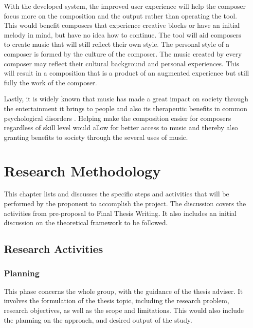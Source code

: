With the developed system, the improved user experience will help the composer focus more on the composition and the output rather than operating the tool. This would benefit composers that experience creative blocks or have an initial melody in mind, but have no idea how to continue. The tool will aid composers to create music that will still reflect their own style. The personal style of a composer is formed by the culture of the composer. The music created by every composer may reflect their cultural background and personal experiences. This will result in a composition that is a product of an augmented experience but still fully the work of the composer.

Lastly, it is widely known that music has made a great impact on society through the entertainment it brings to people \citep{hawkins2013pac, donnelly2005spectre} and also its therapeutic benefits in common psychological disorders \citep{kemper2005music}. Helping make the composition easier for composers regardless of skill level would allow for better access to music and thereby also granting benefits to society through the several uses of music.


\section{Research Methodology}
This chapter lists and discusses the specific steps and activities that will be performed by the proponent to accomplish the project. 
The discussion covers the activities from pre-proposal to Final Thesis Writing.  It also includes an initial discussion on the theoretical
framework to be followed.

\subsection{Research Activities}

\subsubsection{Planning}
This phase concerns the whole group, with the guidance of the thesis adviser. It involves the formulation of the thesis topic, including the research problem, research objectives, as well as the scope and limitations. This would also include the planning on the approach, and desired output of the study. 

